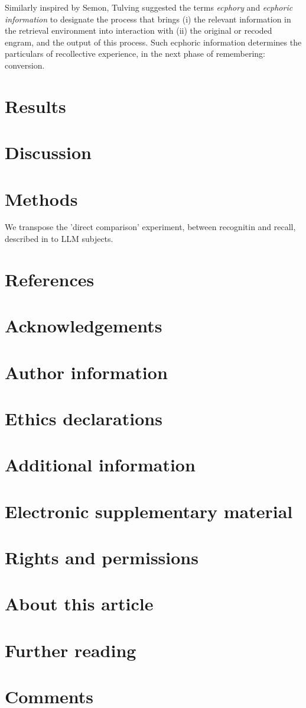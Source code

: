 \documentclass[11pt]{article}
\begin{document}
Similarly inspired by Semon, Tulving suggested the terms \emph{ecphory} and \emph{ecphoric information} to designate the process that brings (i) the relevant information in the retrieval environment into interaction with  (ii) the original or recoded engram, and the output of this process. Such ecphoric information determines the particulars of recollective experience, in the next phase of remembering: conversion.

\section*{Results}
\label{sec:org97969f3}
\section*{Discussion}
\label{sec:org9544f30}
\section*{Methods}
\label{sec:org9aa4c74}
We transpose the 'direct comparison' experiment, between recognitin and recall, described in \citep[Chapter 14]{Tulving1983} to LLM subjects.
\section*{References}
\label{sec:org097a374}




\section*{Acknowledgements}
\label{sec:org7f045cd}
\section*{Author information}
\label{sec:org5faadc3}
\section*{Ethics declarations}
\label{sec:org1e1c8bc}
\section*{Additional information}
\label{sec:org907a432}
\section*{Electronic supplementary material}
\label{sec:org2850bf3}
\section*{Rights and permissions}
\label{sec:orgcbe19a4}
\section*{About this article}
\label{sec:orgdfe8963}
\section*{Further reading}
\label{sec:orgcdf3069}
\section*{Comments}
\label{sec:org92cff51}
\end{document}
